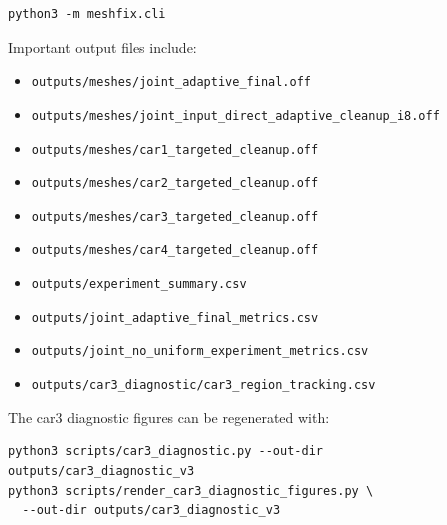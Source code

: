\documentclass[11pt,a4paper]{article}
\newcommand{\code}[1]{\texttt{#1}}
\begin{document}
\begin{verbatim}
python3 -m meshfix.cli
\end{verbatim}

Important output files include:
\begin{itemize}
  \item \code{outputs/meshes/joint\_adaptive\_final.off}
  \item \code{outputs/meshes/joint\_input\_direct\_adaptive\_cleanup\_i8.off}
  \item \code{outputs/meshes/car1\_targeted\_cleanup.off}
  \item \code{outputs/meshes/car2\_targeted\_cleanup.off}
  \item \code{outputs/meshes/car3\_targeted\_cleanup.off}
  \item \code{outputs/meshes/car4\_targeted\_cleanup.off}
  \item \code{outputs/experiment\_summary.csv}
  \item \code{outputs/joint\_adaptive\_final\_metrics.csv}
  \item \code{outputs/joint\_no\_uniform\_experiment\_metrics.csv}
  \item \code{outputs/car3\_diagnostic/car3\_region\_tracking.csv}
\end{itemize}

The car3 diagnostic figures can be regenerated with:
\begin{verbatim}
python3 scripts/car3_diagnostic.py --out-dir outputs/car3_diagnostic_v3
python3 scripts/render_car3_diagnostic_figures.py \
  --out-dir outputs/car3_diagnostic_v3
\end{verbatim}



\end{document}
